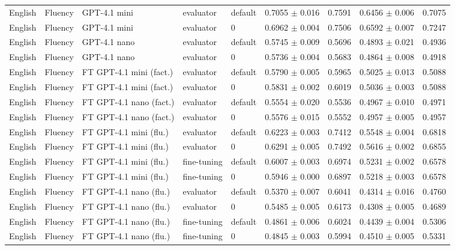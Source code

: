 \begin{tabular}{lllllcccc}
English & Fluency & GPT-4.1 mini & evaluator & default & 0.7055 $\pm$ 0.016 & 0.7591 & 0.6456 $\pm$ 0.006 & 0.7075 \\
English & Fluency & GPT-4.1 mini & evaluator & 0 & 0.6962 $\pm$ 0.004 & 0.7506 & 0.6592 $\pm$ 0.007 & 0.7247 \\
English & Fluency & GPT-4.1 nano & evaluator & default & 0.5745 $\pm$ 0.009 & 0.5696 & 0.4893 $\pm$ 0.021 & 0.4936 \\
English & Fluency & GPT-4.1 nano & evaluator & 0 & 0.5736 $\pm$ 0.004 & 0.5683 & 0.4864 $\pm$ 0.008 & 0.4918 \\
English & Fluency & FT GPT-4.1 mini (fact.) & evaluator & default & 0.5790 $\pm$ 0.005 & 0.5965 & 0.5025 $\pm$ 0.013 & 0.5088 \\
English & Fluency & FT GPT-4.1 mini (fact.) & evaluator & 0 & 0.5831 $\pm$ 0.002 & 0.6019 & 0.5036 $\pm$ 0.003 & 0.5088 \\
English & Fluency & FT GPT-4.1 nano (fact.) & evaluator & default & 0.5554 $\pm$ 0.020 & 0.5536 & 0.4967 $\pm$ 0.010 & 0.4971 \\
English & Fluency & FT GPT-4.1 nano (fact.) & evaluator & 0 & 0.5576 $\pm$ 0.015 & 0.5552 & 0.4957 $\pm$ 0.005 & 0.4957 \\
English & Fluency & FT GPT-4.1 mini (flu.) & evaluator & default & 0.6223 $\pm$ 0.003 & 0.7412 & 0.5548 $\pm$ 0.004 & 0.6818 \\
English & Fluency & FT GPT-4.1 mini (flu.) & evaluator & 0 & 0.6291 $\pm$ 0.005 & 0.7492 & 0.5616 $\pm$ 0.002 & 0.6855 \\
English & Fluency & FT GPT-4.1 mini (flu.) & fine-tuning & default & 0.6007 $\pm$ 0.003 & 0.6974 & 0.5231 $\pm$ 0.002 & 0.6578 \\
English & Fluency & FT GPT-4.1 mini (flu.) & fine-tuning & 0 & 0.5946 $\pm$ 0.000 & 0.6897 & 0.5218 $\pm$ 0.003 & 0.6578 \\
English & Fluency & FT GPT-4.1 nano (flu.) & evaluator & default & 0.5370 $\pm$ 0.007 & 0.6041 & 0.4314 $\pm$ 0.016 & 0.4760 \\
English & Fluency & FT GPT-4.1 nano (flu.) & evaluator & 0 & 0.5485 $\pm$ 0.005 & 0.6173 & 0.4308 $\pm$ 0.005 & 0.4689 \\
English & Fluency & FT GPT-4.1 nano (flu.) & fine-tuning & default & 0.4861 $\pm$ 0.006 & 0.6024 & 0.4439 $\pm$ 0.004 & 0.5306 \\
English & Fluency & FT GPT-4.1 nano (flu.) & fine-tuning & 0 & 0.4845 $\pm$ 0.003 & 0.5994 & 0.4510 $\pm$ 0.005 & 0.5331 \\

\end{tabular}
